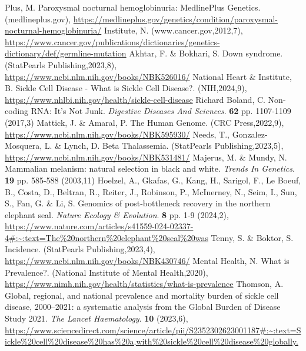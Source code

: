 \documentclass{mva_style}
\begin{document}
\begin{thebibliography}{99}
Plus, M. Paroxysmal nocturnal hemoglobinuria: MedlinePlus Genetics. (medlineplus.gov), \url{https://medlineplus.gov/genetics/condition/paroxysmal-nocturnal-hemoglobinuria/}
Institute, N. (www.cancer.gov,2012,7), \url{https://www.cancer.gov/publications/dictionaries/genetics-dictionary/def/germline-mutation}
Akhtar, F. \& Bokhari, S. Down syndrome. (StatPearls Publishing,2023,8), \url{https://www.ncbi.nlm.nih.gov/books/NBK526016/}
National Heart \& Institute, B. Sickle Cell Disease - What is Sickle Cell Disease?. (NIH,2024,9), \url{https://www.nhlbi.nih.gov/health/sickle-cell-disease}
Richard Boland, C. Non-coding RNA: It’s Not Junk. {\em Digestive Diseases And Sciences}. \textbf{62} pp. 1107-1109 (2017,3)
Mattick, J. \& Amaral, P. The Human Genome. (CRC Press,2022,9), \url{https://www.ncbi.nlm.nih.gov/books/NBK595930/}
Needs, T., Gonzalez-Mosquera, L. \& Lynch, D. Beta Thalassemia. (StatPearls Publishing,2023,5), \url{https://www.ncbi.nlm.nih.gov/books/NBK531481/}
Majerus, M. \& Mundy, N. Mammalian melanism: natural selection in black and white. {\em Trends In Genetics}. \textbf{19} pp. 585-588 (2003,11)
Hoelzel, A., Gkafas, G., Kang, H., Sarigol, F., Le Boeuf, B., Costa, D., Beltran, R., Reiter, J., Robinson, P., McInerney, N., Seim, I., Sun, S., Fan, G. \& Li, S. Genomics of post-bottleneck recovery in the northern elephant seal. {\em Nature Ecology \& Evolution}. \textbf{8} pp. 1-9 (2024,2), \url{https://www.nature.com/articles/s41559-024-02337-4#:~:text=The\%20northern\%20elephant\%20seal\%20was}
Tenny, S. \& Boktor, S. Incidence. (StatPearls Publishing,2023,4), \url{https://www.ncbi.nlm.nih.gov/books/NBK430746/}
Mental Health, N. What is Prevalence?. (National Institute of Mental Health,2020), \url{https://www.nimh.nih.gov/health/statistics/what-is-prevalence}
Thomson, A. Global, regional, and national prevalence and mortality burden of sickle cell disease, 2000–2021: a systematic analysis from the Global Burden of Disease Study 2021. {\em The Lancet Haematology}. \textbf{10} (2023,6), \url{https://www.sciencedirect.com/science/article/pii/S2352302623001187#:~:text=Sickle\%20cell\%20disease\%20has\%20a,with\%20sickle\%20cell\%20disease\%20globally.}

\end{thebibliography}
\end{document}
